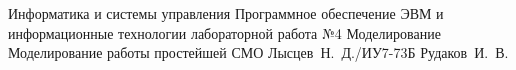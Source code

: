 \documentclass{bmstu}
\begin{document}
\makereporttitle
{Информатика и системы управления} %
{Программное обеспечение ЭВМ и информационные технологии}
{лабораторной работа №4} %
{Моделирование} %
{Моделирование работы простейшей СМО} %
{} %
{Лысцев~Н.~Д./ИУ7-73Б} %
{Рудаков~И.~В.} %
{}

\maketableofcontents

%


%
%
%

\end{document}
